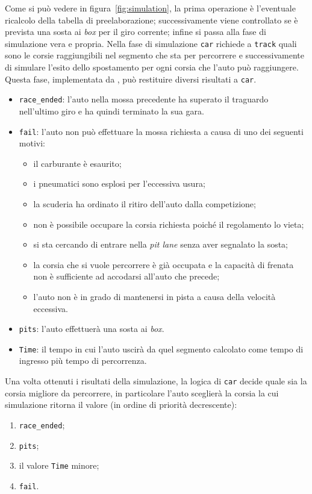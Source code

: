 Come si può vedere in figura~\ref{fig:simulation}, la prima operazione è l'eventuale ricalcolo della tabella di preelaborazione; successivamente viene controllato se è prevista una sosta ai \textit{box} per il giro corrente; infine si passa alla fase di simulazione vera e propria. Nella fase di simulazione \texttt{car} richiede a \texttt{track} quali sono le corsie raggiungibili nel segmento che sta per percorrere e successivamente di simulare l'esito dello spostamento per ogni corsia che l'auto può raggiungere. Questa fase, implementata da , può restituire diversi risultati a \texttt{car}.
\begin{itemize}
\item \texttt{race\_ended}: l'auto nella mossa precedente ha superato il traguardo nell'ultimo giro e ha quindi terminato la sua gara.
\item \texttt{fail}: l'auto non può effettuare la mossa richiesta a causa di uno dei seguenti motivi:
        \begin{itemize}
        \item il carburante è esaurito;
        \item i pneumatici sono esplosi per l'eccessiva usura;
        \item la scuderia ha ordinato il ritiro dell'auto dalla competizione;
        \item non è possibile occupare la corsia richiesta poiché il regolamento lo vieta;
        \item si sta cercando di entrare nella \textit{pit lane} senza aver segnalato la sosta;
        \item la corsia che si vuole percorrere è già occupata e la capacità di frenata non è sufficiente ad accodarsi all'auto che precede;
        \item l'auto non è in grado di mantenersi in pista a causa della velocità eccessiva.
        \end{itemize}
\item \texttt{pits}: l'auto effettuerà una sosta ai \textit{box}.
\item \texttt{Time}: il tempo in cui l'auto uscirà da quel segmento calcolato come tempo di ingresso più tempo di percorrenza.
\end{itemize}
Una volta ottenuti i risultati della simulazione, la logica di \texttt{car} decide quale sia la corsia migliore da percorrere, in particolare l'auto sceglierà la corsia la cui simulazione ritorna il valore (in ordine di priorità decrescente):
\begin{enumerate}
\item \texttt{race\_ended};
\item \texttt{pits};
\item il valore \texttt{Time} minore;
\item \texttt{fail}.
\end{enumerate}

